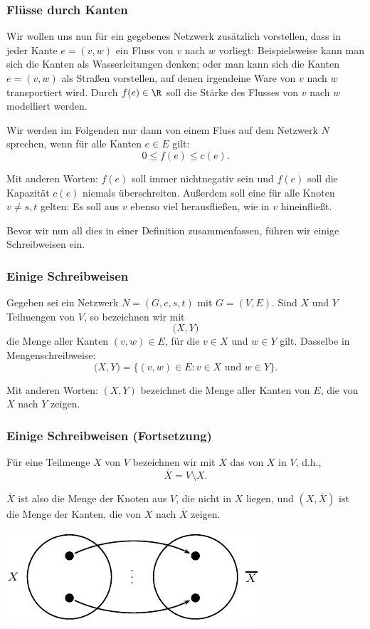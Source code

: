 \documentclass[smaller]{beamer}
\begin{document}
\begin{frame}
\frametitle{Flüsse durch Kanten}
Wir wollen uns nun für ein gegebenes Netzwerk zusätzlich vorstellen, dass in jeder Kante $e=(v,w)$ ein {\glqq}Fluss{\grqq} von $v$ nach $w$ vorliegt: Beispielsweise kann man sich die \alert{Kanten als Wasserleitungen} denken; oder man kann sich die Kanten $e=(v,w)$ \alert{als Straßen} vorstellen, auf denen irgendeine Ware von $v$ nach $w$ transportiert wird. Durch $f(e) \in \R$ soll die Stärke des Flusses von $v$ nach $w$ modelliert werden. \\ \vspace*{0.2cm}

Wir werden im Folgenden nur dann von einem Fluss auf dem Netzwerk $N$ sprechen, wenn für alle Kanten $e \in E$ gilt:
\[
0 \leq f(e) \leq c(e).
\]

Mit anderen Worten: $f(e)$ soll immer nichtnegativ sein und $f(e)$ soll die Kapazität $c(e)$ niemals über\-schrei\-ten. Außerdem soll eine  für alle Knoten $v \neq s,t$ gelten: \alert{Es soll aus $v$ ebenso viel herausfließen, wie in $v$ hineinfließt}. \\ \vspace*{0.2cm}

Bevor wir nun all dies in einer Definition zusammenfassen, führen wir einige Schreibweisen ein.
\end{frame}

\begin{frame}
 \frametitle{Einige Schreibweisen}
 Gegeben sei ein Netzwerk $N=(G,c,s,t)$ mit $G=(V,E)$. Sind $X$ und $Y$ Teilmengen von $V$, so bezeichnen wir mit
\[
\big(X,Y\big)
\]
die Menge aller Kanten $(v,w) \in E$, für die $v \in X$ und $w \in Y$ gilt. Dasselbe in Mengenschreibweise:
\[
\big(X,Y\big) = \Big\{ (v,w) \in E : v \in X \text{ und } w \in Y \Big\}.
\]

Mit anderen Worten: \alert{$(X,Y)$ bezeichnet die Menge aller Kanten von $E$, die von $X$ nach $Y$ zeigen}.
\end{frame}

\begin{frame}
 \frametitle{Einige Schreibweisen (Fortsetzung)}
 Für eine Teilmenge $X$ von $V$ bezeichnen wir mit $\overline{X}$ das  von $X$ in $V$, d.h.,
\[
\overline{X} = V \setminus X.
\]

$\overline{X}$ ist also die Menge der Knoten aus $V$, die nicht in $X$ liegen, und $(X, \overline{X})$ ist die Menge der Kanten, die von $X$ nach $\overline{X}$ zeigen.

\begin{center}
 \includegraphics{fig8.pdf}
\end{center}

\end{frame}
\end{document}

